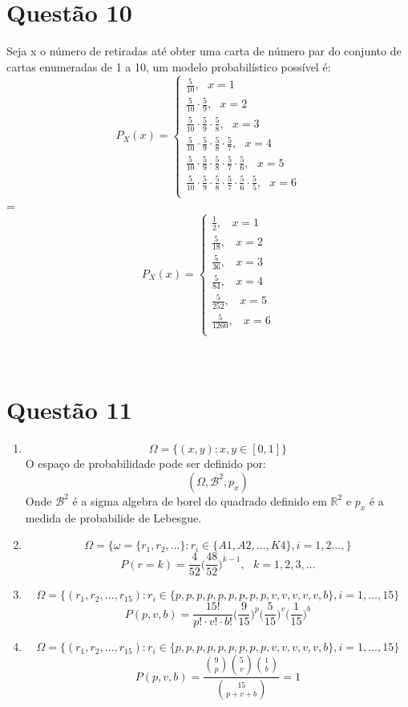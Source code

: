 \documentclass[a4paper,12pt]{report}
\begin{document}
\section{Questão  10}
Seja x o número de retiradas até obter uma carta de número par do conjunto de cartas enumeradas de 1 a 10, um modelo probabilístico possível é:
$$
P_X(x)= 
\begin{cases}
\frac{5}{10}, \ \ \ x=1\\
\frac{5}{10}\cdot\frac{5}{9}, \ \ \ x=2\\
\frac{5}{10}\cdot\frac{5}{9}\cdot\frac{5}{8}, \ \ \ x=3\\
\frac{5}{10}\cdot\frac{5}{9}\cdot\frac{5}{8}\cdot\frac{5}{7}, \ \ \ x=4\\
\frac{5}{10}\cdot\frac{5}{9}\cdot\frac{5}{8}\cdot\frac{5}{7}\cdot\frac{5}{6}, \ \ \ x=5\\
\frac{5}{10}\cdot\frac{5}{9}\cdot\frac{5}{8}\cdot\frac{5}{7}\cdot\frac{5}{6}\cdot\frac{5}{5}, \ \ \ x=6\\
\end{cases}
$$
=
$$
P_X(x)= 
\begin{cases}
\frac{1}{2}, \ \ \ \ x=1\\
\frac{5}{18}, \ \ \ \ x=2\\
\frac{5}{36}, \ \ \ \ x=3\\
\frac{5}{84}, \ \ \ \ x=4\\
\frac{5}{252},\ \ \ \ x=5\\
\frac{5}{1260},\ \ \ \ x=6\\
\end{cases}
$$
\newpage

\
\section{Questão  11}
\begin{enumerate}[label=\alph* )]
	\item $$\Omega=\bigg\{(x,y): x,y\in [0,1] \bigg\} $$
O espaço de probabilidade pode ser definido por:
$$(\Omega,\mathscr B^2,p_x) $$
Onde $\mathscr B^2$ é a sigma algebra de borel do quadrado definido em $\mathbb R^2$ e $p_x$ é a medida de probabilide de Lebesgue.
\item 
$$\Omega = \bigg\{\omega= \{r_1,r_2,\ldots \}:  r_i\in \{A1,A2,\ldots,K4 \},i=1,2\ldots,\bigg\}  $$
$$P(r=k)= \frac{4}{52}\bigg(\frac{48}{52}\bigg)^{k-1}, \ \ \ k=1,2,3,\ldots $$

\item 

$$\Omega = \bigg\{ (r_1,r_2,\ldots,r_15):  r_i\in \{p,p,p,p,p,p,p,p,p,v,v,v,v,v,b \},i=1,\ldots,15 \bigg\} $$
$$P(p,v,b)= \frac{15!}{p!\cdot v!\cdot b!} \bigg(\frac{9}{15}\bigg)^p\bigg(\frac{5}{15}\bigg)^v\bigg(\frac{1}{15}\bigg)^b $$
\item 
$$\Omega = \bigg\{ (r_1,r_2,\ldots,r_{15}):  r_i\in \{p,p,p,p,p,p,p,p,p,v,v,v,v,v,b \},i=1,\ldots,15 \bigg\} $$
$$P(p,v,b) =\frac{\binom{9}{p}\binom{5}{v}\binom{1}{b}}{\binom{15}{p+v+b}}= 1 $$
\end{enumerate}
\newpage
\end{document}
